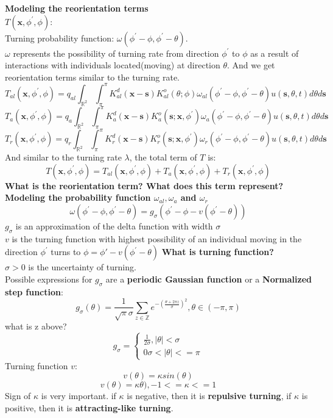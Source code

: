 \documentclass{article}
\begin{document}
\noindent
\textbf{\large {Modeling the reorientation terms}}
\\
$T(\boldsymbol{x},\phi^{'},\phi)$:\\
Turning probability function:
$\omega(\phi^{'}-\phi,\phi^{'}-\theta)$.\\
$\omega$ represents the possibility of turning rate from direction $\phi^{'}$ to $\phi$ as a result of interactions with individuals located(moving) at direction $\theta$.
And we get reorientation terms similar to the turning rate.\\
$$T_{al}(\boldsymbol{x},\phi^{'},\phi)
=q_{al}\int_{\mathbb{R}^2}\int^{\pi}_{\pi}K^{d}_{al}(\boldsymbol{x}-\boldsymbol{s})K^{o}_{al}(\theta;\phi)\omega_{al}(\phi^{'}-\phi,\phi^{'}-\theta)
u(\boldsymbol{s},\theta,t)d\theta d\boldsymbol{s}$$
$$T_{a}(\boldsymbol{x},\phi^{'},\phi)
=q_{a}\int_{\mathbb{R}^2}\int^{\pi}_{\pi}K^{d}_{a}(\boldsymbol{x}-\boldsymbol{s})K^{o}_{a}(\boldsymbol{s};\boldsymbol{x},\phi^{'})\omega_{a}(\phi^{'}-\phi,\phi^{'}-\theta)
u(\boldsymbol{s},\theta,t)d\theta d\boldsymbol{s}$$
$$T_{r}(\boldsymbol{x},\phi^{'},\phi)
=q_{r}\int_{\mathbb{R}^2}\int^{\pi}_{\pi}K^{d}_{r}(\boldsymbol{x}-\boldsymbol{s})K^{o}_{r}(\boldsymbol{s};\boldsymbol{x},\phi^{'})\omega_{r}(\phi^{'}-\phi,\phi^{'}-\theta)
u(\boldsymbol{s},\theta,t)d\theta d\boldsymbol{s}$$
And similar to the turning rate $\lambda$, the total term of $T$ is:
$$T(\boldsymbol{x},\phi^{'},\phi)
=T_{al}(\boldsymbol{x},\phi^{'},\phi)+T_{a}(\boldsymbol{x},\phi^{'},\phi)+T_{r}(\boldsymbol{x},\phi^{'},\phi)$$
{\color{blue} \textbf{What is the reorientation term? What does this term represent?}}\\
\textbf{\large {Modeling the probability function $\omega_{al}, \omega_{a}$ and $\omega_{r}$}}
$$\omega(\phi^{'}-\phi,\phi^{'}-\theta)
=g_{\sigma}(\phi^{'}-\phi-v(\phi^{'}-\theta))$$
$g_\sigma$ is an approximation of the delta function with width $\sigma$\\
$v$ is the turning function with highest possibility of an individual moving in the direction $\phi^{'}$ turns to $\phi=\phi{'}-v(\phi^{'}-\theta)$
{\color{blue} \textbf{What is turning function?}}\\
$\sigma>0$ is the uncertainty of turning. \\
Possible expressions for $g_\sigma$ are a \textbf{periodic Gaussian function} or a \textbf{Normalized step function}:
$$g_{\sigma}(\theta)=
\frac{1}{\sqrt{\pi}\sigma}\sum_{z\in \mathbb{Z}}e^{{-(\frac{\theta+2\pi z}{\sigma})}^2}, \theta \in (-\pi,\pi)$$
what is z above? 
\begin{equation}
  g_{\sigma} =
    \begin{cases}
    \frac{1}{2\sigma}, |\theta|<\sigma\\
      0 \sigma<|\theta|<=\pi
    \end{cases}       
\end{equation}
Turning function $v$:
$$v(\theta)=\kappa sin(\theta)$$
$$v(\theta)=\kappa \theta), -1<=\kappa<=1$$
Sign of $\kappa$ is very important. if $\kappa$ is negative, then it is \textbf{repulsive turning}, if $\kappa$ is positive, then it is \textbf{attracting-like turning}. 
\end{document}
